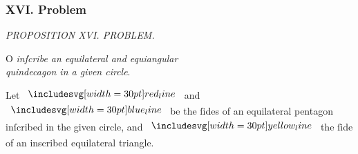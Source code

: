 \documentclass[12pt,preview]{standalone}
\begin{document}
\subsubsection{XVI. Problem}

\begin{minipage}[t]{0.64\textwidth}
    \vspace{0pt}

    \begin{center}
        \textit{PROPOSITION XVI. PROBLEM.}\label{book4pr16} \\
    \end{center}

    \hfill

    \begin{center}
        \raggedright \lettrine[lines=4, loversize=1, nindent=0pt]{}{}O \textit{inſcribe an equilateral and equiangular\\ quindecagon in a given circle}.
    \end{center}

    \hfill

    \hfill

    \hfill

    \raggedright Let $\redline$ and $\blueline$ be the ſides of an equilateral pentagon inſcribed in the given circle, and $\yellowline$ the ſide of an inscribed equilateral triangle.

    \hfill


\end{minipage}
\end{document}
